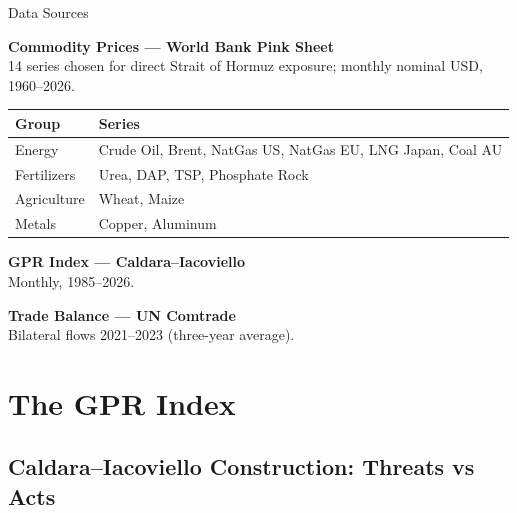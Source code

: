 ﻿\documentclass[aspectratio=1610]{beamer}
\begin{document}
\begin{frame}[shrink=20]{Data Sources}

\textbf{Commodity Prices --- World Bank Pink Sheet}\\[4pt]
14 series chosen for direct Strait of Hormuz exposure; monthly nominal USD, 1960--2026.\\[8pt]
\medskip
\begin{tabular}{ll}
    \toprule
    Group        & Series \\
    \midrule
    Energy       & Crude Oil, Brent, NatGas US, NatGas EU, LNG Japan, Coal AU \\
    Fertilizers  & Urea, DAP, TSP, Phosphate Rock \\
    Agriculture  & Wheat, Maize \\
    Metals       & Copper, Aluminum \\
    \bottomrule
  \end{tabular}

  \medskip

  \textbf{GPR Index --- Caldara--Iacoviello \parencite{caldara_measuring_2022}}\\[4pt]
  Monthly, 1985--2026.

  \medskip
  \textbf{Trade Balance --- UN Comtrade}\\[4pt]
  Bilateral flows 2021--2023 (three-year average).

\end{frame}


\section{The GPR Index}

\subsection{Caldara--Iacoviello Construction: Threats vs Acts}
\end{document}
